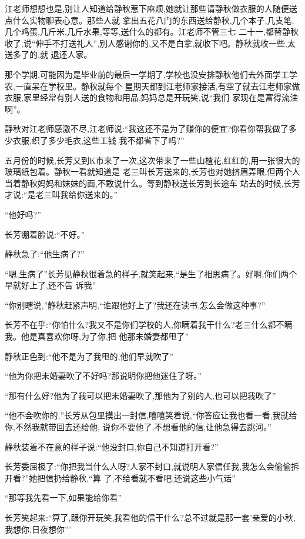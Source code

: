 ﻿\documentclass[12pt]{article}
\begin{document}
江老师想想也是,别让人知道给静秋惹下麻烦,她就让那些请静秋做衣服的人随便送点什么实物聊表心意。那些人就
拿出五花八门的东西送给静秋,几个本子,几支笔,几个鸡蛋,几斤米,几斤水果,等等,送什么的都有。江老师不管三七
二十一,都替静秋收了,说``伸手不打送礼人'',别人感谢你的,又不是白拿,就收下吧。静秋就收一些,太送多了的,就
退还人家。

那个学期,可能因为是毕业前的最后一学期了,学校也没安排静秋他们去外面学工学农,一直呆在学校里。静秋就每个
星期天都到江老师家接活,有空了就去江老师家做衣服,家里经常有别人送的食物和用品,妈妈总是开玩笑,说``我们
家现在是富得流油啊''。

静秋对江老师感激不尽,江老师说:``我这还不是为了赚你的便宜?你看你帮我做了多少衣服,织了多少毛衣,这些工钱
我不都省下了吗?''

五月份的时候,长芳又到K市来了一次,这次带来了一些山楂花,红红的,用一张很大的玻璃纸包着。静秋一看就知道是
老三叫长芳送来的,长芳也对她挤眉弄眼,但两个人当着静秋妈妈和妹妹的面,不敢说什么。等到静秋送长芳到长途车
站去的时候,长芳才说:``是老三叫我给你送来的。''

``他\myrule 好吗?''

长芳绷着脸说:``不好。''

静秋急了:``他\myrule 生病了?''

``嗯,生病了\myrule ''长芳见静秋很着急的样子,就笑起来,``是生了相思病了。好啊,你们两个早就好上了,还不告
诉我\myrule ''

``你别瞎说,''静秋赶紧声明,``谁跟他好上了?我还在读书,怎么会做这种事?''

长芳不在乎:``你怕什么?我又不是你们学校的人,你瞒着我干什么?老三什么都不瞒我。他是真喜欢你呀,为了你,把
他那未婚妻都甩了\myrule ''

静秋正色到:``他不是为了我甩的,他们早就吹了\myrule ''

``他为你把未婚妻吹了不好吗?那说明你把他迷住了呀。''

``那有什么好?他为了我可以把未婚妻吹了,那他为了别的人,也可以把我吹了\myrule ''

``他不会吹你的,''长芳从包里摸出一封信,嘻嘻笑着说,``你答应让我也看一看,我就给你,不然我就带回去还给他,
说你不要他了,不想看他的信,让他急得去跳河。''

静秋装着不在意的样子说:``他没封口,你自己不知道打开看?''

长芳委屈极了:``你把我当什么人呀?人家不封口,就说明人家信任我,我怎么会偷偷拆开看?''她把信扔给静秋,``算
了,不给看就不看吧,还说这些小气话\myrule ''

``那\myrule 等我先看一下,如果能给你看\myrule ''

长芳笑起来:``算了,跟你开玩笑,我看他的信干什么?总不过就是那一套'亲爱的小秋,我想你,日夜想你\myrule '''
\end{document}
